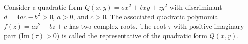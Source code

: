 Consider a quadratic form $Q(x, y) = ax^2 + bxy + cy^2$ with discriminant $d = 4ac - b^2 > 0$, $a > 0$, and $c > 0$. The associated quadratic polynomial $f(z) = az^2 + bz + c$ has two complex roots. The root $\tau$ with positive imaginary part ($\text{Im}(\tau) > 0$) is called the representative of the quadratic form $Q(x, y)$.
